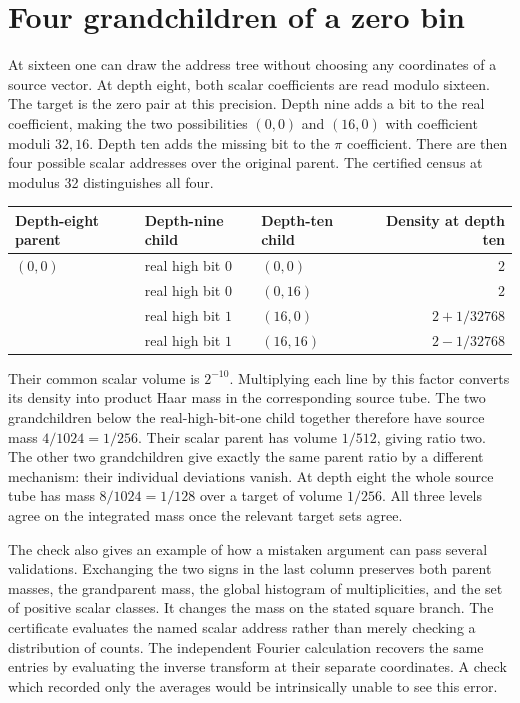 \documentclass[12pt,letterpaper]{article}
\begin{document}
\section{Four grandchildren of a zero bin}
At sixteen one can draw the address tree without choosing any coordinates of a source vector. At depth eight, both scalar coefficients are read modulo sixteen. The target is the zero pair at this precision. Depth nine adds a bit to the real coefficient, making the two possibilities $(0,0)$ and $(16,0)$ with coefficient moduli $32,16$. Depth ten adds the missing bit to the $\pi$ coefficient. There are then four possible scalar addresses over the original parent. The certified census at modulus 32 distinguishes all four.

\begin{center}\small
\begin{tabular}{@{}lllr@{}}\toprule
Depth-eight parent&Depth-nine child&Depth-ten child&Density at depth ten\\\midrule
$(0,0)$&real high bit $0$&$(0,0)$&$2$\\
&real high bit $0$&$(0,16)$&$2$\\[2pt]
&real high bit $1$&$(16,0)$&$2+1/32768$\\
&real high bit $1$&$(16,16)$&$2-1/32768$\\\bottomrule
\end{tabular}
\end{center}
Their common scalar volume is $2^{-10}$. Multiplying each line by this factor converts its density into product Haar mass in the corresponding source tube. The two grandchildren below the real-high-bit-one child together therefore have source mass $4/1024=1/256$. Their scalar parent has volume $1/512$, giving ratio two. The other two grandchildren give exactly the same parent ratio by a different mechanism: their individual deviations vanish. At depth eight the whole source tube has mass $8/1024=1/128$ over a target of volume $1/256$. All three levels agree on the integrated mass once the relevant target sets agree.

The check also gives an example of how a mistaken argument can pass several validations. Exchanging the two signs in the last column preserves both parent masses, the grandparent mass, the global histogram of multiplicities, and the set of positive scalar classes. It changes the mass on the stated square branch. The certificate evaluates the named scalar address rather than merely checking a distribution of counts. The independent Fourier calculation recovers the same entries by evaluating the inverse transform at their separate coordinates. A check which recorded only the averages would be intrinsically unable to see this error.
\end{document}
